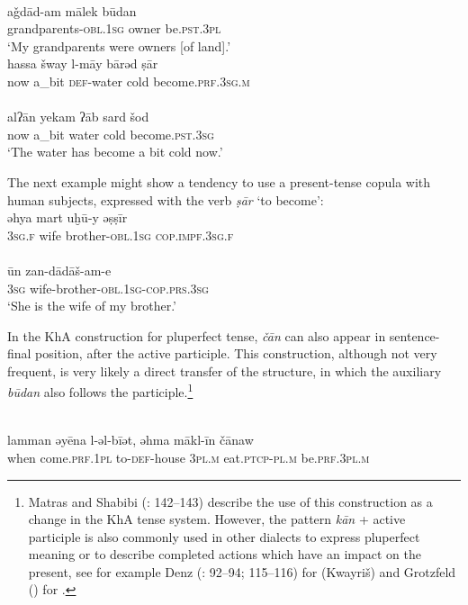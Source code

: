 \documentclass[output=paper,nonflat]{langsci/langscibook}
\begin{document}
\\
\gll aǧdād-am mālek būdan\\
     grandparents-\textsc{obl.1sg} owner be.\textsc{pst.3pl}\\
\glt ‘My grandparents were owners [of land].’
\z\ex\label{cold}
\\
\gll hassa šway l-māy bārəd ṣār\\
     now a\_bit \textsc{def}{}-water cold become.\textsc{prf.3sg.m}\\
 
\\
\gll alʔān yekam ʔāb sard šod\\
     now a\_bit water cold become.\textsc{pst}.\textsc{3sg}\\
\glt ‘The water has become a bit cold now.’
\z\z

The next example might show a tendency to use a present-{tense} {copula} with human subjects, expressed with the verb \textit{ṣār} ‘to become’: 
\ea
{}\\
\gll əhya mart uḫū-y əṣṣīr\\
     3\textsc{sg.f} wife brother-\textsc{obl.1sg} \textsc{cop.impf.3sg.f}\\
 
\\
\gll ūn zan-dādāš-am-e\\
     3\textsc{sg} wife-brother-\textsc{obl.1sg}-\textsc{cop.prs.3sg}\\
\glt ‘She is the wife of my brother.’
\z\z


In the KhA construction for pluperfect {tense}, \textit{čān} can also appear in sentence-final position, after the active {participle}. This construction, although not very frequent, is very likely a direct {transfer} of the  structure, in which the auxiliary \textit{būdan} also follows the {participle}.\footnote{Matras and Shabibi (\citeyear{MatrasShabibi2007}: 142–143) describe the use of this construction as a change in the KhA {tense} system. However, the pattern \textit{kān} + active {participle} is also commonly used in other  dialects to express pluperfect meaning or to describe completed actions which have an impact on the present, see for example Denz (\citeyear{Denz1971}: 92–94; 115–116) for  (Kwayriš) and Grotzfeld (\citeyear[88]{Grotzfeld1965}) for  .} 

\ea {}\\
\gll lamman əyēna l-əl-bīət, əhma mākl-īn čānaw\\
     when come.\textsc{prf.1pl} to-\textsc{def}-house 3\textsc{pl}.\textsc{m} eat.\textsc{ptcp-pl.m} be.\textsc{prf}.\textsc{3pl.m}\\
\end{document}
